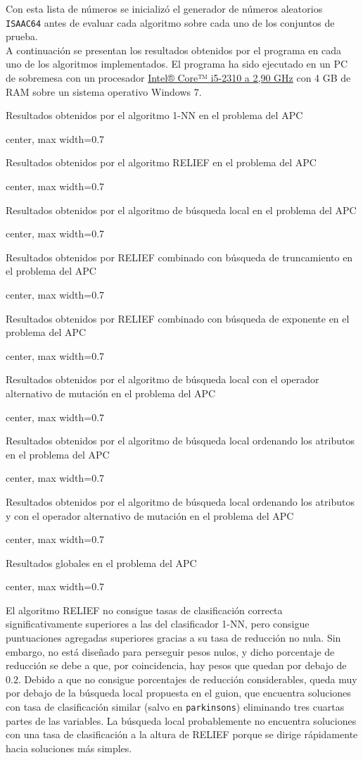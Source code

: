 \documentclass{article}
\begin{document}
Con esta lista de números se inicializó el generador de números aleatorios \texttt{ISAAC64} antes de evaluar cada algoritmo sobre cada uno de los conjuntos de prueba. \\

A continuación se presentan los resultados obtenidos por el programa en cada uno de los algoritmos implementados. El programa ha sido ejecutado en un PC de sobremesa con un procesador \href{https://ark.intel.com/es-es/products/53445/Intel-Core-i5-2310-Processor-6M-Cache-up-to-3_20-GHz}{Intel® Core™ i5-2310 a 2,90 GHz} con 4 GB de RAM sobre un sistema operativo Windows 7.

\newcommand{\resultados}[2]{
\begin{table}[H]
	\centering
	\caption{#2}
	\def\arraystretch{1.27}
	\begin{adjustbox}{center, max width=0.7\textwidth}
		
	\end{adjustbox}
\end{table}
}

\resultados{1-NN}{Resultados obtenidos por el algoritmo 1-NN en el problema del APC}
\resultados{RELIEF}{Resultados obtenidos por el algoritmo RELIEF en el problema del APC}
\resultados{BL}{Resultados obtenidos por el algoritmo de búsqueda local en el problema del APC}
\resultados{RELIEF+tr}{Resultados obtenidos por RELIEF combinado con búsqueda de truncamiento en el problema del APC}
\resultados{RELIEF+pw}{Resultados obtenidos por RELIEF combinado con búsqueda de exponente en el problema del APC}
\resultados{BL-mut2}{Resultados obtenidos por el algoritmo de búsqueda local con el operador alternativo de mutación en el problema del APC}
\resultados{BL-ord}{Resultados obtenidos por el algoritmo de búsqueda local ordenando los atributos en el problema del APC}
\resultados{BL-ord-mut2}{Resultados obtenidos por el algoritmo de búsqueda local ordenando los atributos y con el operador alternativo de mutación en el problema del APC}
\resultados{tabla-global}{Resultados globales en el problema del APC}

El algoritmo RELIEF no consigue tasas de clasificación correcta significativamente superiores a las del clasificador 1-NN, pero consigue puntuaciones agregadas superiores gracias a su tasa de reducción no nula. Sin embargo, no está diseñado para perseguir pesos nulos, y dicho porcentaje de reducción se debe a que, por coincidencia, hay pesos que quedan por debajo de $0.2$. Debido a que no consigue porcentajes de reducción considerables, queda muy por debajo de la búsqueda local propuesta en el guion, que encuentra soluciones con tasa de clasificación similar (salvo en \texttt{parkinsons}) eliminando tres cuartas partes de las variables. La búsqueda local probablemente no encuentra soluciones con una tasa de clasificación a la altura de RELIEF porque se dirige rápidamente hacia soluciones más simples. \\
\end{document}
